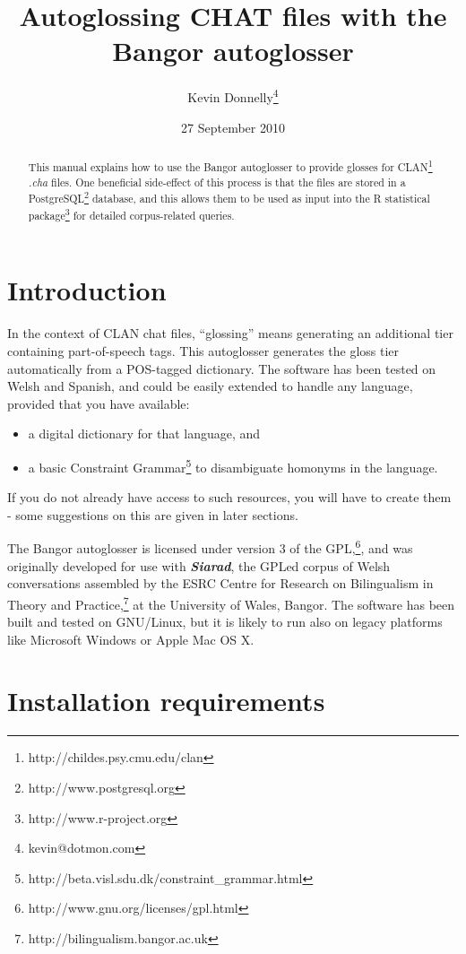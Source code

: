\documentclass[a4paper,10pt]{article}
\title{\textbf{Autoglossing CHAT files with the Bangor autoglosser}}
\author{Kevin Donnelly\thanks{kevin@dotmon.com}}
\date{27 September 2010}
\begin{document}
\maketitle

\begin{abstract}
This manual explains how to use the Bangor autoglosser to provide glosses for  CLAN\footnote{http://childes.psy.cmu.edu/clan} \textit{.cha} files.  One beneficial side-effect of this process is that the files are stored in a PostgreSQL\footnote{http://www.postgresql.org} database, and this allows them to be used as input into the R statistical package\footnote{http://www.r-project.org} for detailed corpus-related queries.
\end{abstract}


\section{Introduction}
\label{sec:intro}

In the context of CLAN chat files, ``glossing'' means generating an additional tier containing part-of-speech tags.  This autoglosser generates the gloss tier automatically from a POS-tagged dictionary.  The software has been tested on Welsh and Spanish, and could be easily extended to handle any language, provided that you have available:
\begin{itemize}
\item a digital dictionary for that language, and
\item a basic Constraint Grammar\footnote{http://beta.visl.sdu.dk/constraint\_grammar.html} to disambiguate homonyms in the language.
\end{itemize}
If you do not already have access to such resources, you will have to create them - some suggestions on this are given in later sections. 

The Bangor autoglosser is licensed under version 3 of the GPL,\footnote{http://www.gnu.org/licenses/gpl.html}, and was originally developed for use with \textit{\textbf{Siarad}}, the GPLed corpus of Welsh conversations assembled by the ESRC Centre for Research on Bilingualism in Theory and Practice,\footnote{http://bilingualism.bangor.ac.uk} at the University of Wales, Bangor.  The software has been built and tested on GNU/Linux, but it is likely to run also on legacy platforms like Microsoft Windows or Apple Mac OS X.


\section{Installation requirements}
\label{sec:requirements}
\end{document}
